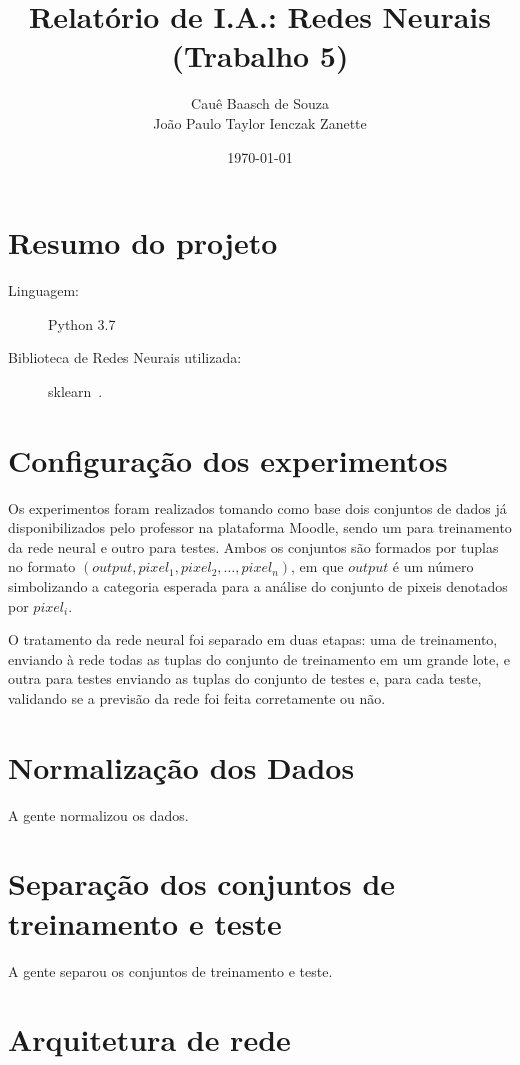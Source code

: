 \documentclass[twocolumn]{article}
\title{Relatório de I.A.: Redes Neurais (Trabalho 5)}
\author{Cauê Baasch de Souza \\
        João Paulo Taylor Ienczak Zanette}
\date{\today}
\begin{document}
    \maketitle{}

    \section{Resumo do projeto}

    \begin{description}
        \item [Linguagem:] Python 3.7
        \item [Biblioteca de Redes Neurais utilizada:] sklearn~\cite{sklearn}.
    \end{description}

    \section{Configuração dos experimentos}

    Os experimentos foram realizados tomando como base dois conjuntos de dados
    já disponibilizados pelo professor na plataforma Moodle, sendo um para
    treinamento da rede neural e outro para testes. Ambos os conjuntos são
    formados por tuplas no formato $(output, pixel_1, pixel_2, \ldots,
    pixel_n)$, em que $output$ é um número simbolizando a categoria esperada
    para a análise do conjunto de pixeis denotados por $pixel_{i}$.

    O tratamento da rede neural foi separado em duas etapas: uma de
    treinamento, enviando à rede todas as tuplas do conjunto de treinamento em
    um grande lote, e outra para testes enviando as tuplas do conjunto de
    testes e, para cada teste, validando se a previsão da rede foi feita
    corretamente ou não.

    \section{Normalização dos Dados}

    A gente normalizou os dados.

    \section{Separação dos conjuntos de treinamento e teste}

    A gente separou os conjuntos de treinamento e teste.

    \section{Arquitetura de rede}
\end{document}
